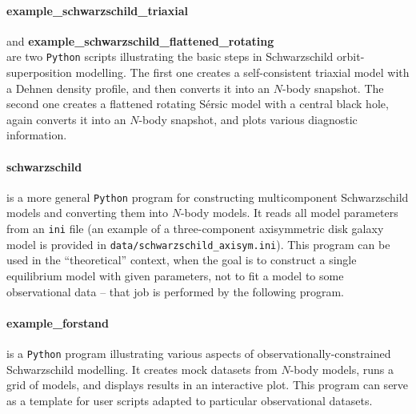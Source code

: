 \documentclass[12pt]{article}
\newcommand{\Python}{\texttt{Python}\xspace}
\begin{document}
\paragraph{example_schwarzschild_triaxial} and \;\;\textbf{example_schwarzschild_flattened_rotating}\;\;\\ are two \Python scripts illustrating the basic steps in Schwarzschild orbit-superposition  modelling. The first one creates a self-consistent triaxial model with a Dehnen density profile, and then converts it into an $N$-body snapshot. The second one creates a flattened rotating S\'ersic model with a central black hole, again converts it into an $N$-body snapshot, and plots various diagnostic information.

\paragraph{schwarzschild} is a more general \Python program for constructing multicomponent Schwarzschild models and converting them into $N$-body models. It reads all model parameters from an \texttt{ini} file (an example of a three-component axisymmetric disk galaxy model is provided in \texttt{data/schwarzschild_axisym.ini}). This program can be used in the ``theoretical'' context, when the goal is to construct a single equilibrium model with given parameters, not to fit a model to some observational data -- that job is performed by the following program.

\paragraph{example_forstand} is a \Python program illustrating various aspects of observationally-constrained Schwarzschild modelling. It creates mock datasets from $N$-body models, runs a grid of models, and displays results in an interactive plot. This program can serve as a template for user scripts adapted to particular observational datasets.

\label{sec:mkspherical}%
\end{document}
